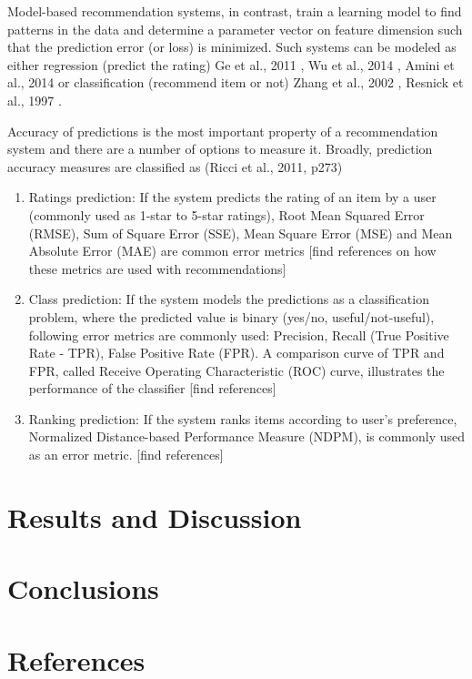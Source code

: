 \documentclass[12pt]{article}
\begin{document}
Model-based recommendation systems, in contrast, train a learning model to find patterns in the data and determine a parameter vector on feature dimension such that the prediction error (or loss) is minimized. Such systems can be modeled as either regression (predict the rating) Ge et al., 2011 \cite{ge}, Wu et al., 2014 \cite{wu}, Amini et al., 2014 \cite{amini} or classification (recommend item or not) Zhang et al., 2002 \cite{zhang-iyengar}, Resnick et al., 1997 \cite{resnick}. 

Accuracy of predictions is the most important property of a recommendation system and there are a number of options to measure it. Broadly, prediction accuracy measures are classified as (Ricci et al., 2011, p273) \cite{ricci}

\begin{enumerate}
	\item Ratings prediction: If the system predicts the rating of an item by a user (commonly used as 1-star to 5-star ratings), Root Mean Squared Error (RMSE), Sum of Square Error (SSE), Mean Square Error (MSE) and Mean Absolute Error (MAE) are common error metrics [find references on how these metrics are used with recommendations]
	\item Class prediction: If the system models the predictions as a classification problem, where the predicted value is binary (yes/no, useful/not-useful), following error metrics are commonly used: Precision, Recall (True Positive Rate - TPR), False Positive Rate (FPR). A comparison curve of TPR and FPR, called Receive Operating Characteristic (ROC) curve, illustrates the performance of the classifier [find references]
	\item Ranking prediction: If the system ranks items according to user's preference, Normalized Distance-based Performance Measure (NDPM), is commonly used as an error metric. [find references]
\end{enumerate}

\newpage\section{Results and Discussion}

\newpage\section{Conclusions}

\newpage\section{References}
\end{document}
